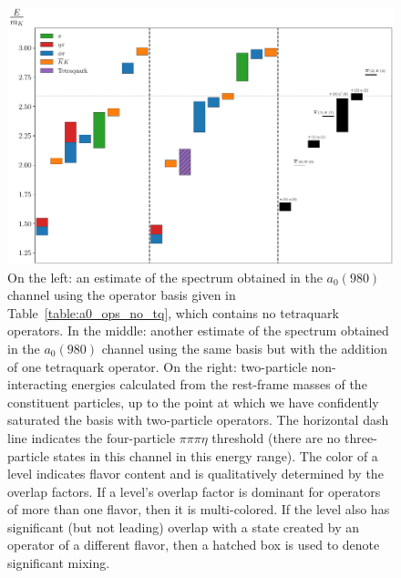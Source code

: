 \begin{figure}
  \centering
  \hspace*{-0.5in}\includegraphics[width=\textwidth]{figures/spectrum_a1gm/staircase.pdf}
  \caption[A comparison of spectrum determinations made in the $a_0(980)$ channel.]{On the left: an estimate of the spectrum obtained in the $a_0(980)$ channel using the operator basis given in Table~\ref{table:a0_ops_no_tq}, which contains no tetraquark operators. In the middle: another estimate of the spectrum obtained in the $a_0(980)$ channel using the same basis but with the addition of one tetraquark operator. On the right: two-particle non-interacting energies calculated from the rest-frame masses of the constituent particles, up to the point at which we have confidently saturated the basis with two-particle operators. The horizontal dash line indicates the four-particle $\pi\pi\pi\eta$ threshold (there are no three-particle states in this channel in this energy range). The color of a level indicates flavor content and is qualitatively determined by the overlap factors. If a level's overlap factor is dominant for operators of more than one flavor, then it is multi-colored. If the level also has significant (but not leading) overlap with a state created by an operator of a different flavor, then a hatched box is used to denote significant mixing.}
  \label{fig:a0_spectrum}
\end{figure}